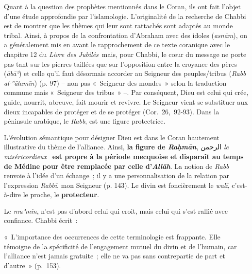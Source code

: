 Quant à la question des prophètes mentionnés dans le Coran, ils ont fait
l'objet d'une étude approfondie par l'islamologie. L'originalité de la recherche de Chabbi est de
montrer que les thèmes qui leur sont rattachés sont adaptés au monde
tribal. Ainsi, à propos de la confrontation d'Abraham avec des idoles
(\emph{asnām}), on a généralement mis en avant le rapprochement de ce
texte coranique avec le chapitre 12 du \emph{Livre des
Jubilés}~mais, pour
Chabbi, le cœur du message ne porte pas tant sur les pierres taillées
que sur l'opposition entre la croyance des pères (\emph{ābāʾ}) et celle
qu'il faut désormais accorder au Seigneur des peuples/tribus (\emph{Rabb
al-ʿālamīn}) (p. 97) -- non pas «~Seigneur des mondes~» selon la
traduction commune mais «~Seigneur des tribus~» --. Par conséquent, Dieu
est celui qui crée, guide, nourrit, abreuve, fait mourir et revivre. Le
Seigneur vient se substituer aux dieux incapables de protéger et de se
protéger (Cor.~26,~92-93). Dans la péninsule arabique, le \emph{Rabb},
est une figure protectrice.

 



L'évolution sémantique pour désigner Dieu est dans le Coran hautement
illustrative du thème de l'alliance. Ainsi, \textbf{la figure de
\emph{Raḥmān}}, الرحمن \emph{le miséricordieux}~ \textbf{est propre à la
période mecquoise et disparaît au temps de Médine pour être remplacée
par celle d'\emph{Allāh}}. La notion de \emph{Rabb} renvoie à l'idée
d'un échange~; il y a une personnalisation de la relation par
l'expression \emph{Rabbī}, mon Seigneur (p. 143). Le divin est
foncièrement le \emph{walī}, c'est-à-dire le proche, le
\textbf{protecteur}.

Le \emph{muʾmin}, n'est pas
d'abord celui qui croit, mais celui qui s'est rallié avec confiance.
Chabbi écrit~:

«~L'importance des occurrences de cette terminologie est frappante. Elle
témoigne de la spécificité de l'engagement mutuel du divin et de
l'humain, car l'alliance n'est jamais gratuite~; elle ne va pas sans
contrepartie de part et d'autre~» (p.~153).

